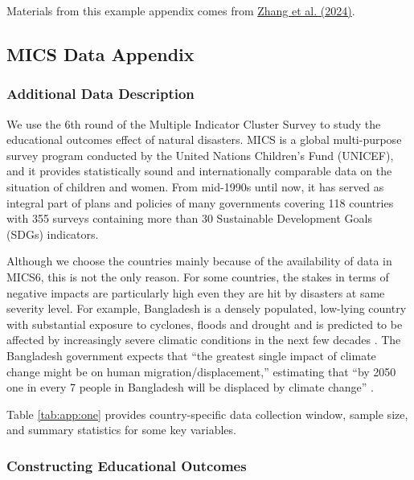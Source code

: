 Materials from this example appendix comes from 
\href{https://yujiezhangecon.github.io/files/research/PrjRDSE/ZBHMWDisasterLearningAsia.pdf}{Zhang et al. (2024)}.

\subsection{MICS Data Appendix\label{Data_Appendix_MICS}}

\subsubsection{Additional Data Description}

We use the 6th round of the Multiple Indicator Cluster Survey \autocite{mics6_unicef_2023} to study the educational outcomes effect of natural disasters. MICS is a global multi-purpose survey program conducted by the United Nations Children's Fund (UNICEF), and it provides statistically sound and internationally comparable data on the situation of children and women. From mid-1990s until now, it has served as integral part of plans and policies of many governments covering 118 countries with 355 surveys containing more than 30 Sustainable Development Goals (SDGs) indicators. 
 
Although we choose the countries mainly because of the availability of data in MICS6, this is not the only reason. For some countries, the stakes in terms of negative impacts are particularly high even they are hit by disasters at same severity level. For example, Bangladesh is a densely populated, low-lying country with substantial exposure to cyclones, floods and drought and is predicted to be affected by increasingly severe climatic conditions in the next few decades \autocite{stocker_climate_2014}. The Bangladesh government expects that “the greatest single impact of climate change might be on human migration/displacement,” estimating that “by 2050 one in every 7 people in Bangladesh will be displaced by climate change” \autocite{comprehensive_disaster_management_programme_2015}. 

Table \ref{tab:app:one} provides country-specific data collection window, sample size, and summary statistics for some key variables. \blindtext

\subsubsection{Constructing Educational Outcomes}

